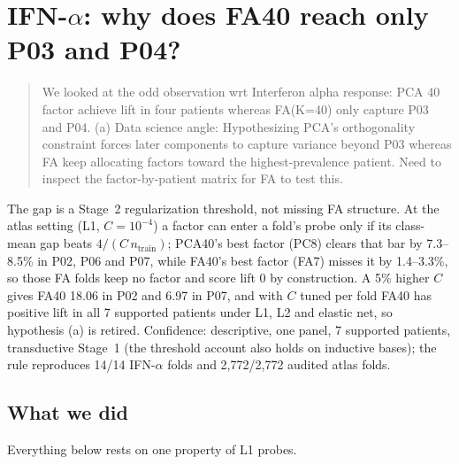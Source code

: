 \section{\texorpdfstring{IFN-$\alpha$}{IFN-alpha}: why does FA40 reach only P03 and P04?}
\label{sec:ifna-pca-vs-fa}

\begin{quote}
We looked at the odd observation wrt Interferon alpha response: PCA 40 factor achieve lift in four patients whereas FA(K=40) only capture P03 and P04.
(a) Data science angle: Hypothesizing PCA's orthogonality constraint forces later components to capture variance beyond P03 whereas FA keep allocating factors toward the highest-prevalence patient. Need to inspect the factor-by-patient matrix for FA to test this.
\end{quote}

\begin{answerbox}
The gap is a Stage~2 regularization threshold, not missing FA structure. At the atlas setting (L1, $C = 10^{-4}$) a factor can enter a fold's probe only if its class-mean gap beats $4/(C\,n_{\mathrm{train}})$; PCA40's best factor (PC8) clears that bar by 7.3--8.5\% in P02, P06 and P07, while FA40's best factor (FA7) misses it by 1.4--3.3\%, so those FA folds keep no factor and score lift 0 by construction. A 5\% higher $C$ gives FA40 18.06\pp{} in P02 and 6.97\pp{} in P07, and with $C$ tuned per fold FA40 has positive lift in all 7 supported patients under L1, L2 and elastic net, so hypothesis (a) is retired. Confidence: descriptive, one panel, 7 supported patients, transductive Stage~1 (the threshold account also holds on inductive bases); the rule reproduces 14/14 IFN-$\alpha$ folds and 2,772/2,772 audited atlas folds.
\end{answerbox}

\subsection*{What we did}

Everything below rests on one property of L1 probes.

